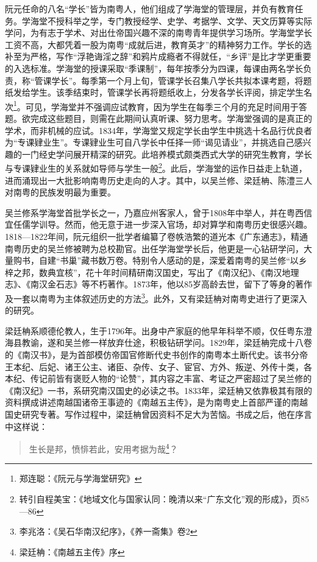 阮元任命的八名“学长”皆为南粤人，他们组成了学海堂的管理层，并负有教育任务。学海堂不授科举之学，专门教授经学、史学、考据学、文学、天文历算等实际学问，为有志于学术、对出仕帝国兴趣不深的南粤青年提供学习场所。学海堂学长工资不高，大都凭着一股为南粤“成就后进，教育英才”的精神努力工作。学长的选补至为严格，写作“浮艳诲淫之辞”和鸦片成瘾者不得就任，“乡评”是比才学更重要的入选标准。学海堂的授课采取“季课制”，每年按季分为四课，每课由两名学长负责，称“管课学长”。每季第一个月上旬，管课学长召集八学长共拟本课考题，将题纸发给学生。该季结束时，管课学长再将题纸收上，分发各学长评阅，排定学生名次\footnote{郑连聪：《阮元与学海堂研究》}。可见，学海堂并不强调应试教育，因为学生在每季三个月的充足时间用于答题。欲完成这些题目，则需在此期间认真听课、努力思考。学海堂强调的是真正的学术，而非机械的应试。1834年，学海堂又规定学长由学生中挑选十名品行优良者为“专课肄业生”。专课肄业生可自八学长中任择一师“谒见请业”，并挑选自己感兴趣的一门经史学问展开精深的研究。此培养模式颇类西式大学的研究生教育，学长与专课肄业生的关系就如导师与学生一般\footnote{转引自程美宝：《地域文化与国家认同：晚清以来“广东文化”观的形成》，页85—86}。此后，学海堂的运作日益走上轨道，进而涌现出一大批影响南粤历史走向的人才。其中，以吴兰修、梁廷柟、陈澧三人对南粤的民族发明最为重要。

吴兰修系学海堂首批学长之一，乃嘉应州客家人，曾于1808年中举人，并在粤西信宜任儒学训导。然而，他无意于进一步深入官场，却对算学和南粤历史很感兴趣。1818—1822年间，阮元组织一批学者编纂了卷帙浩繁的道光本《广东通志》，精通南粤历史的吴兰修被聘为总校勘官。出任学海堂学长后，他更是一心钻研学问，大量购书，自建“书巢”藏书数万卷。特别令人感动的是，深爱着南粤的吴兰修“以乡梓之邦，数典宜核”，花十年时间精研南汉国史，写出了《南汉纪》、《南汉地理志》、《南汉金石志》等不朽著作。1873年，他以85岁高龄去世，留下了等身的著作及一套以南粤为主体叙述历史的方法\footnote{李兆洛：《吴石华南汉纪序》，《养一斋集》卷2}。此外，又有梁廷柟对南粤史进行了更深入的研究。

梁廷柟系顺德伦教人，生于1796年。出身中产家庭的他早年科举不顺，仅任粤东澄海县教谕，遂和吴兰修一样放弃仕途，积极钻研学问。1829年，梁廷柟完成十八卷的《南汉书》，是为首部模仿帝国官修断代史书创作的南粤本土断代史。该书分帝王本纪、后妃、诸王公主、诸臣、杂传、女子、宦官、方外、叛逆、外传十类，各本纪、传记前皆有褒贬人物的“论赞”，其内容之丰富、考证之严密超过了吴兰修的《南汉纪》一书，系研究南汉国史的必读之书。1833年，梁廷柟又依靠极其有限的资料撰成讲述南越国诸帝王事迹的《南越五主传》，是为南粤史上首部严谨的南越国史研究专著。写作过程中，梁廷柟曾因资料不足大为苦恼。书成之后，他在序言中这样说：


\begin{quote}
生长是邦，愤悱若此，安用考据为哉\footnote{梁廷柟：《南越五主传》序}？
\end{quote}

